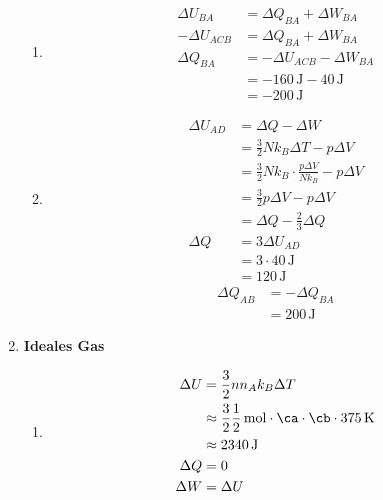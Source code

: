 \documentclass[11pt,letterpaper]{article}
\begin{document}
\begin{enumerate}
\begin{enumerate}
            \item 
            \begin{align*}
                \Delta U_{BA} &= \Delta Q_{BA} + \Delta W_{BA}\\
                -\Delta U_{ACB} &= \Delta Q_{BA} + \Delta W_{BA}\\
                \Delta Q_{BA} &= -\Delta U_{ACB} - \Delta W_{BA}\\
                &= -160 \,\mathrm{J} - 40 \,\mathrm{J}\\
                &= -200 \,\mathrm{J}
            \end{align*}

            \item 
            \begin{align*}
                \Delta U _{AD} &= \Delta Q - \Delta W\\ 
                &= \frac{3}{2} N k_B \Delta T -p\Delta V\\
                &= \frac{3}{2} N k_B \cdot \frac{p \Delta V}{N k_B} -p\Delta V\\ 
                &= \frac{3}{2}p \Delta V -p\Delta V\\ 
                &= \Delta Q - \frac{2}{3}\Delta Q\\ 
                \Delta Q &= 3 \Delta U _{AD}\\
                &= 3\cdot 40\,\mathrm{J}\\
                &= 120 \,\mathrm{J}
            \end{align*}
            \begin{align*}
                \Delta Q _{AB} &= -\Delta Q _{BA}\\
                &= 200 \,\mathrm{J}
            \end{align*}
            
        \end{enumerate}

    \item \textbf{Ideales Gas}
        \begin{enumerate}
            \item 
            \begin{align*}
                \Delta U &= \frac{3}{2} n n_A k_B \Delta T\\
                &\approx \frac{3}{2} \frac{1}{2} \,\mathrm{mol}\cdot \ca\cdot \cb \cdot375\,\mathrm{K}\\
                &\approx 2340 \,\mathrm{J}\\
                \Delta Q &= 0 \\
                \Delta W &= \Delta U\\
            \end{align*}


\end{enumerate}
\end{enumerate}
\end{document}
